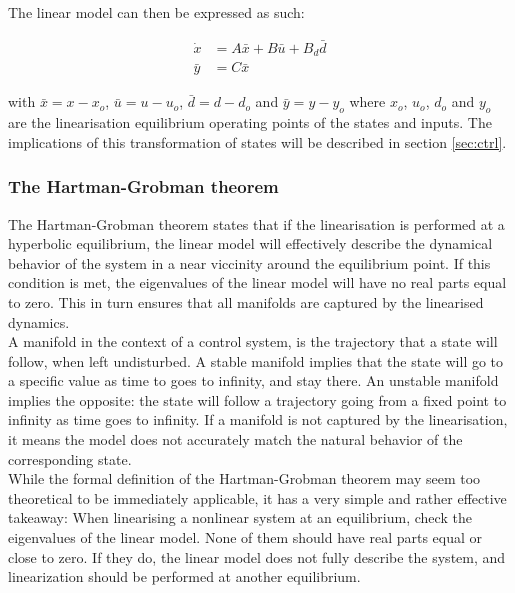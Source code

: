 The linear model can then be expressed as such:

\begin{equation} \label{eq:state_space_linear}
	\begin{split}
		\dot{x} & = A\bar{x} + B\bar{u} + B_d\bar{d} \\
		\bar{y} & = C\bar{x}
	\end{split}
\end{equation}

with $\bar{x} = x-x_o$, $\bar{u} = u-u_o$, $\bar{d} = d-d_o$ and $\bar{y} = y-y_o$ where $x_o$, $u_o$, $d_o$ and $y_o$ are the linearisation equilibrium operating points of the states and inputs. The implications of this transformation of states will be described in section \cref{sec:ctrl}.\\
\subsubsection{The Hartman-Grobman theorem}

The Hartman-Grobman theorem states that if the linearisation is performed at a hyperbolic equilibrium, the linear model will effectively describe the dynamical behavior of the system in a near viccinity around the equilibrium point. If this condition is met, the eigenvalues of the linear model will have no real parts equal to zero. This in turn ensures that all manifolds are captured by the linearised dynamics. \\
A manifold in the context of a control system, is the trajectory that a state will follow, when left undisturbed. A stable manifold implies that the state will go to a specific value as time to goes to infinity, and stay there. An unstable manifold implies the opposite: the state will follow a trajectory going from a fixed point to infinity as time goes to infinity. If a manifold is not captured by the linearisation, it means the model does not accurately match the natural behavior of the corresponding state.\\

While the formal definition of the Hartman-Grobman theorem may seem too theoretical to be immediately applicable, it has a very simple and rather effective takeaway: When linearising a nonlinear system at an equilibrium, check the eigenvalues of the linear model. None of them should have real parts equal or close to zero. If they do, the linear model does not fully describe the system, and linearization should be performed at another equilibrium.


